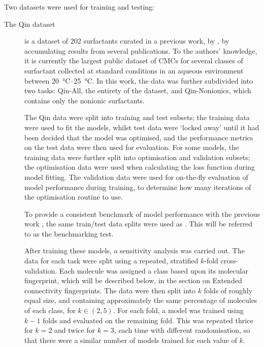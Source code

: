 \newcommand{\lrv}{\vec{v}^{\,(p)}}

Two datasets were used for training and testing:

\begin{description}
    \item[The Qin dataset] is a dataset of 202 surfactants curated in a
          previous work, by \citet{qinPredictingCriticalMicelle2021}, by
          accumulating results from several publications. To the authors'
          knowledge, it is currently the largest public dataset of CMCs for
          several classes of surfactant collected at standard conditions in an
          aqueous environment between \SIrange{20}{25}{\celsius}. In this work,
          the data was further subdivided into two tasks: Qin-All, the entirety of
          the dataset, and Qin-Nonionics, which contains only the nonionic
          surfactants.

          The Qin data were split into training and test subsets; the training
          data were used to fit the models, whilst test data were `locked away'
          until it had been decided that the model was optimised, and the
          performance metrics on the test data were then used for evaluation. For
          some models, the training data were further split into optimisation and
          validation subsets; the optimisation data were used when calculating the
          loss function during model fitting. The validation data were used for
          on-the-fly evaluation of model performance during training, to determine
          how many iterations of the optimisation routine to use.

          To provide a consistent benchmark of model performance with
          the previous work \cite{qinPredictingCriticalMicelle2021}, the same
          train/test data splits were used as
          \citet{qinPredictingCriticalMicelle2021}. This will be referred to as
          the benchmarking test.

          After training these models, a sensitivity analysis was carried out.
          The data for each task were split using a repeated, stratified
          $k$-fold cross-validation. Each molecule was assigned a class based
          upon its molecular fingerprint, which will be described below, in the
          section on Extended connectivity fingerprints. The data were then
          split into $k$ folds of roughly equal size, and containing
          approximately the same percentage of molecules of each class, for $k
          \in (2, 5)$. For each fold, a model was trained using $k-1$ folds and
          evaluated on the remaining fold. This was repeated thrice for $k = 2$
          and twice for $k = 3$, each time with different randomisation, so that
          there were a similar number of models trained for each value of $k$.


\end{description}
